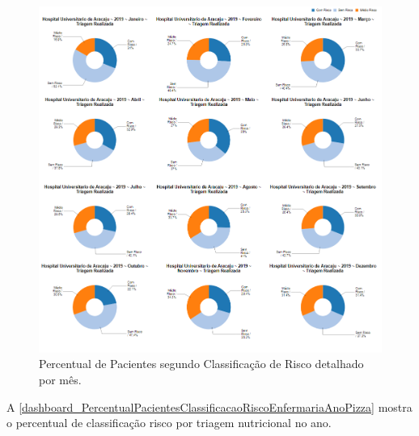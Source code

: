 \begin{figure}[htb]
	\caption{\label{dashboard_PercentualPacientesClassificacaoRiscoHospitalMesPizza}Percentual de Pacientes segundo Classificação de Risco detalhado por mês.}
	\begin{center}
	    \includegraphics[scale=0.6]{Imagens/2.2.PercentualPacientesClassificacaoRiscoHospitalMesPizza.png}
	\end{center}
\end{figure}

\clearpage
A \autoref{dashboard_PercentualPacientesClassificacaoRiscoEnfermariaAnoPizza} mostra o percentual de classificação risco por triagem nutricional no ano.

